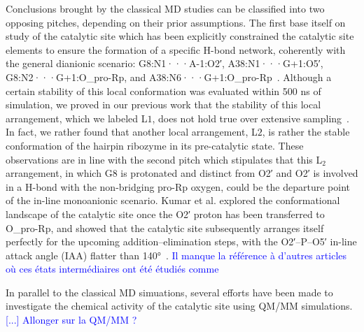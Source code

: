 \documentclass[journal=jacsat,manuscript=article]{achemso}
\def\selrev#1{\textcolor{blue}{#1}}
\begin{document}
Conclusions brought by the classical MD studies can be classified into two opposing pitches, depending on their prior assumptions.
The first base itself on study of the catalytic site
which has been explicitly constrained the catalytic site elements to ensure the formation of a specific H-bond
network, coherently with the general dianionic scenario: G8:N1···A-1:O2′, A38:N1···G+1:O5′, G8:N2···G+1:O_pro-Rp, and A38:N6···G+1:O_pro-Rp~\cite{mlynsky_reactive_2015,veenis_investigation_2021}.
Although a certain stability of this local conformation was evaluated within 500 ns of simulation,
we proved in our previous work that the stability of this local arrangement, which we labeled L$\mathrm{1}$,
does not hold true over extensive sampling~\cite{forget2024simulation}.
In fact, we rather found that another local arrangement,
L$\mathrm{2}$, is rather the stable conformation of the hairpin ribozyme in its pre-catalytic state.
These observations are in line with the second pitch which stipulates that this L$_\mathrm{2}$ arrangement,
in which G8 is protonated and distinct from O2′ and O2′ is involved in a H-bond with the non-bridging pro-Rp oxygen,
could be the departure point of the in-line monoanionic scenario.
Kumar et al. explored the conformational landscape of the catalytic site once the O2′ proton has been transferred to O_pro-Rp,
and showed that the catalytic site subsequently arranges itself perfectly for the upcoming addition–elimination steps,
with the O2′–P–O5′ in-line attack angle (IAA) flatter than 140°~\cite{kumar_mechanistic_2018}.
\selrev{Il manque la référence à d'autres articles où ces états intermédiaires ont été étudiés comme~\cite{}}



In parallel to the classical MD simuations, 
several efforts have been made to investigate the chemical activity of the catalytic site using QM/MM simulations.
\selrev{[...] Allonger sur la QM/MM ?}
\end{document}
